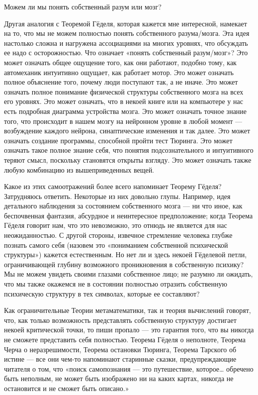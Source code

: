 \documentclass[../main.tex]{subfiles}
\begin{document}
Можем ли мы понять собственный разум или мозг?

Другая аналогия с Теоремой Гёделя, которая кажется мне интересной, намекает на то, что мы не можем полностью понять собственного разума/мозга. Эта идея настолько сложна и нагружена ассоциациями на многих уровнях, что обсуждать ее надо с осторожностью. Что означает «понять собственный разум/мозг»? Это может означать общее ощущение того, как они работают, подобно тому, как автомеханик интуитивно ощущает, как работает мотор. Это может означать полное объяснение того, почему люди поступают так, а не иначе. Это может означать полное понимание физической структуры собственного мозга на всех его уровнях. Это может означать, что в некоей книге или на компьютере у нас есть подробная диаграмма устройства мозга. Это может означать точное знание того, что происходит в нашем мозгу на нейронном уровне в любой момент --- возбуждение каждого нейрона, синаптические изменения и так далее. Это может означать создание программы, способной пройти тест Тюринга. Это может означать такое полное знание себя, что понятия подсознательного и интуитивного теряют смысл, поскольку становятся открыты взгляду. Это может означать также любую комбинацию из вышеприведенных вещей.

Какое из этих самоотражений более всего напоминает Теорему Гёделя? Затрудняюсь ответить. Некоторые из них довольно глупы. Например, идея детального наблюдения за состоянием собственного мозга --- ни что иное, как беспочвенная фантазия, абсурдное и неинтересное предположение; когда Теорема Гёделя говорит нам, что это невозможно, это отнюдь не является для нас неожиданностью. С другой стороны, извечное стремление человека глубже познать самого себя (назовем это «пониманием собственной психической структуры») кажется естественным. Но нет ли и здесь некоей Гёделевой петли, ограничивающей глубину возможного проникновения в собственную психику? Мы не можем увидеть своими глазами собственное лицо; не разумно ли ожидать, что мы также окажемся не в состоянии полностью отразить собственную психическую структуру в тех символах, которые ее составляют?

Как ограничительные Теории метаматематики, так и теория вычислений говорят, что, как только возможность представлять собственную структуру достигает некоей критической точки, то пиши пропало --- это гарантия того, что вы никогда не сможете представить себя полностью. Теорема Гёделя о неполноте, Теорема Черча о неразрешимости, Теорема остановки Тюринга, Теорема Тарского об истине --- все они чем-то напоминают старинные сказки, предупреждающие читателя о том, что «поиск самопознания --- это путешествие, которое\ldots{} обречено быть неполным, не может быть изображено ни на каких картах, никогда не остановится и не сможет быть описано.»
\end{document}
